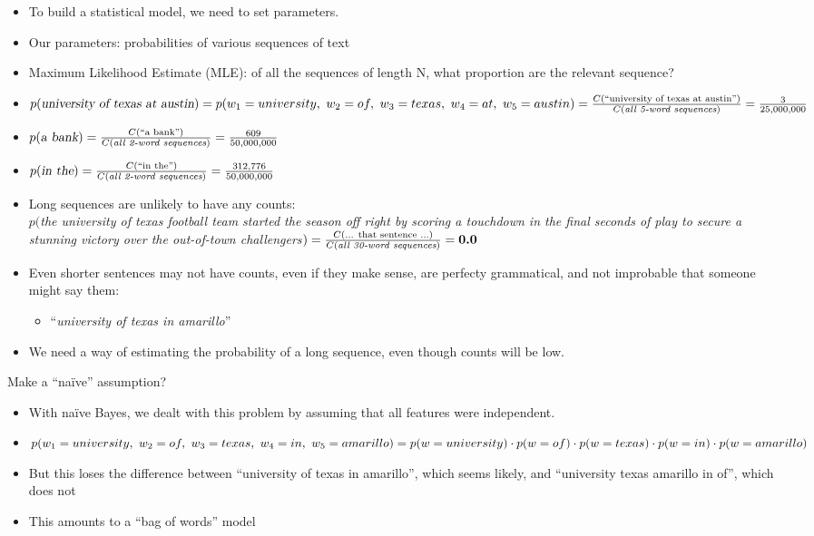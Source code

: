 \documentclass[11pt,letterpaper]{article}
\begin{document}
\begin{itemize}
  \item To build a statistical model, we need to set parameters.
  \item Our parameters: probabilities of various sequences of text
  \item Maximum Likelihood Estimate (MLE): of all the sequences of length N, what proportion are the relevant sequence?
  \item $p(\textsl{university of texas at austin}) \\
        = p(w_1=university, ~ w_2=of, ~ w_3=texas, ~ w_4=at, ~ w_5=austin)\\
        = \frac{C(\text{``university of texas at austin''})}{C(\textit{all 5-word sequences})}
        = \frac {3}{25,000,000}$
  \\
  \item $p(\textsl{a bank}) = \frac{C(\text{``a bank''})}{C(\textit{all 2-word sequences})} = \frac{609}{50,000,000}$
  \item $p(\textsl{in the}) = \frac{C(\text{``in the''})}{C(\textit{all 2-word sequences})} = \frac{312,776}{50,000,000}$
  \\
  \item Long sequences are unlikely to have any counts: \\
  $p($\textsl{the university of texas football team started the season off right by scoring a touchdown in the final seconds of play to secure a stunning victory over the out-of-town challengers}$) \\
  = \frac{C(\text{... that sentence ...})}{C(\textit{all 30-word sequences})} = \textbf{0.0}$
  \item Even shorter sentences may not have counts, even if they make sense, are perfecty grammatical, and not improbable that someone might say them: 
    \begin{itemize} \item ``\textsl{university of texas in amarillo}'' \end{itemize}
  \item We need a way of estimating the probability of a long sequence, even though counts will be low.
\end{itemize}

Make a ``na\"{i}ve'' assumption?

\begin{itemize}
  \item With na\"{i}ve Bayes, we dealt with this problem by assuming that all features were independent.
  \item $p(w_1=university, ~ w_2=of, ~ w_3=texas, ~ w_4=in, ~ w_5=amarillo) = \\
         p(w=university) \cdot p(w=of) \cdot p(w=texas) \cdot p(w=in) \cdot p(w=amarillo)$
  \item But this loses the difference between ``university of texas in amarillo'', which seems likely, and ``university texas amarillo in of'', which does not
  \item This amounts to a ``bag of words'' model
\end{itemize}
\end{document}
